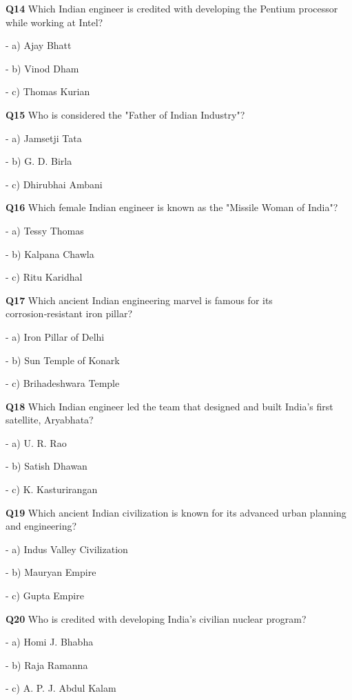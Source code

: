 \textbf{Q14} Which Indian engineer is credited with developing the Pentium processor while working at Intel?\par
\quad - a) Ajay Bhatt\par
\quad - b) Vinod Dham\par
\quad - c) Thomas Kurian\par

\textbf{Q15} Who is considered the "Father of Indian Industry"?\par
\quad - a) Jamsetji Tata\par
\quad - b) G. D. Birla\par
\quad - c) Dhirubhai Ambani\par

\textbf{Q16} Which female Indian engineer is known as the "Missile Woman of India"?\par
\quad - a) Tessy Thomas\par
\quad - b) Kalpana Chawla\par
\quad - c) Ritu Karidhal\par

\textbf{Q17} Which ancient Indian engineering marvel is famous for its corrosion‑resistant iron pillar?\par
\quad - a) Iron Pillar of Delhi\par
\quad - b) Sun Temple of Konark\par
\quad - c) Brihadeshwara Temple\par

\textbf{Q18} Which Indian engineer led the team that designed and built India's first satellite, Aryabhata?\par
\quad - a) U. R. Rao\par
\quad - b) Satish Dhawan\par
\quad - c) K. Kasturirangan\par

\textbf{Q19} Which ancient Indian civilization is known for its advanced urban planning and engineering?\par
\quad - a) Indus Valley Civilization\par
\quad - b) Mauryan Empire\par
\quad - c) Gupta Empire\par

\textbf{Q20} Who is credited with developing India's civilian nuclear program?\par
\quad - a) Homi J. Bhabha\par
\quad - b) Raja Ramanna\par
\quad - c) A. P. J. Abdul Kalam\par

